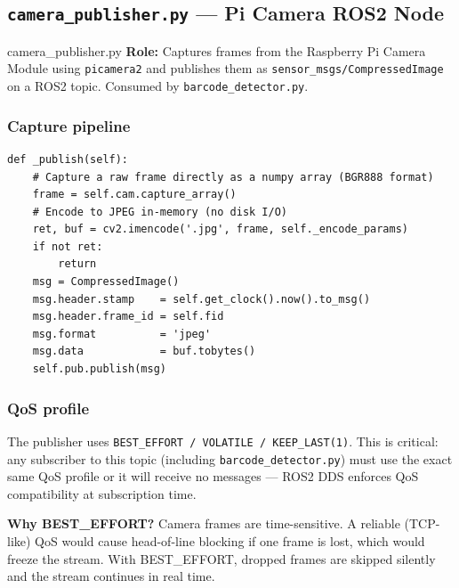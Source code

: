 \documentclass[11pt,a4paper]{article}
\begin{document}
\subsection{\texttt{camera\_publisher.py} — Pi Camera ROS2 Node}

\begin{filebox}{camera\_publisher.py}
\textbf{Role:} Captures frames from the Raspberry Pi Camera Module using
\texttt{picamera2} and publishes them as \texttt{sensor\_msgs/CompressedImage}
on a ROS2 topic. Consumed by \texttt{barcode\_detector.py}.
\end{filebox}

\subsubsection{Capture pipeline}

\begin{lstlisting}[style=python, caption=Camera capture and publish loop]
def _publish(self):
    # Capture a raw frame directly as a numpy array (BGR888 format)
    frame = self.cam.capture_array()
    # Encode to JPEG in-memory (no disk I/O)
    ret, buf = cv2.imencode('.jpg', frame, self._encode_params)
    if not ret:
        return
    msg = CompressedImage()
    msg.header.stamp    = self.get_clock().now().to_msg()
    msg.header.frame_id = self.fid
    msg.format          = 'jpeg'
    msg.data            = buf.tobytes()
    self.pub.publish(msg)
\end{lstlisting}

\subsubsection{QoS profile}

The publisher uses \texttt{BEST\_EFFORT / VOLATILE / KEEP\_LAST(1)}.
This is critical: any subscriber to this topic (including
\texttt{barcode\_detector.py}) must use the exact same QoS profile or it will
receive no messages — ROS2 DDS enforces QoS compatibility at subscription time.

\begin{notebox}
\textbf{Why BEST\_EFFORT?} Camera frames are time-sensitive. A reliable
(TCP-like) QoS would cause head-of-line blocking if one frame is lost, which
would freeze the stream. With BEST\_EFFORT, dropped frames are skipped
silently and the stream continues in real time.
\end{notebox}
\end{document}
